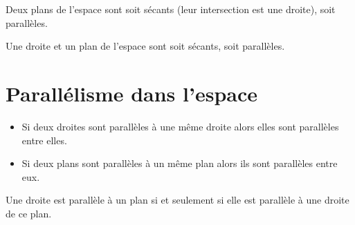 \begin{proprietes}
Deux plans de l'espace sont soit sécants (leur intersection est une
droite), soit parallèles.
\end{proprietes}

\begin{ltableau}{\linewidth}{3}
  \hline
   &  \tabularnewline\hline
  } & 
  } &  
  }\tabularnewline\hline
\end{ltableau}

\pagebreak

\begin{proprietes}
  Une droite et un plan de l'espace sont soit sécants, soit parallèles.
\end{proprietes}

\begin{ltableau}{\linewidth}{4}
  \hline
   & 
   \tabularnewline\hline
  } & 
  } &  
  \centering
  }\tabularnewline
  \hline
\end{ltableau}

\section{Parallélisme dans l'espace}

\begin{propriete}
  \begin{itemize}
  \item Si deux droites sont parallèles à une même droite alors elles
    sont parallèles entre elles.
  \item Si deux plans sont parallèles à un même plan alors ils sont
    parallèles entre eux.
  \end{itemize}
\end{propriete}
           
\begin{propriete}
  Une droite est parallèle à un plan si et seulement si elle est
  parallèle à une droite de ce plan.
\end{propriete}

